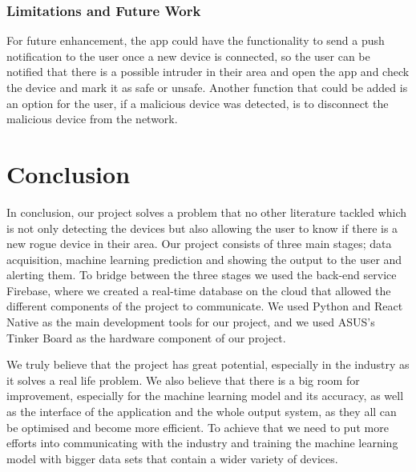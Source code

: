 \documentclass{article}
\begin{document}
\subsubsection{Limitations and Future Work}
For future enhancement, the app could have the functionality to send a push notification to the user once a new device is connected, so the user can be notified that there is a possible intruder in their area and open the app and check the device and mark it as safe or unsafe. Another function that could be added is an option for the user, if a malicious device was detected, is to disconnect the malicious device from the network.

\pagebreak



\pagebreak

\section{Conclusion} In conclusion, our project solves a problem that no other literature tackled which is not only detecting the devices but also allowing the user to know if there is a new rogue device in their area. Our project consists of three main stages; data acquisition, machine learning prediction and showing the output to the user and alerting them. To bridge between the three stages we used the back-end service Firebase, where we created a real-time database on the cloud that allowed the different components of the project to communicate. We used Python and React Native as the main development tools for our project, and we used ASUS's Tinker Board as the hardware component of our project. \newline 

We truly believe that the project has great potential, especially in the industry as it solves a real life problem. We also believe that there is a big room for improvement, especially for the machine learning model and its accuracy, as well as the interface of the application and the whole output system, as they all can be optimised and become more efficient. To achieve that we need to put more efforts into communicating with the industry and training the machine learning model with bigger data sets that contain a wider variety of devices. 
\pagebreak
\end{document}

